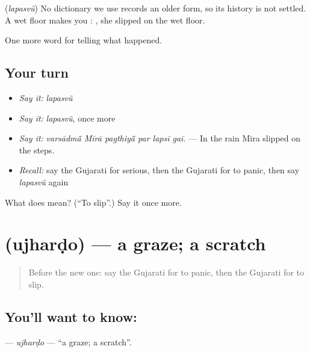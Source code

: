 \begin{cousinweb}
\textbf{} (\emph{lapasvũ}) No dictionary we use records an older form, so its history is not settled. A wet floor makes you \textbf{ }: \textbf{    }, she slipped on the wet floor.
\end{cousinweb}

\begin{grammarlens}[title={What you've built}]
One more word for telling what happened.
\end{grammarlens}

\subsection*{Your turn}
\begin{itemize}
\raggedright
  \item \emph{Say it:} \emph{lapasvũ}
  \item \emph{Say it:} \emph{lapasvũ}, once more
  \item \emph{Say it:} \emph{varsādmā̃ Mīrā pagthiyā̃ par lapsī gaī.} — In the rain Mira slipped on the steps.
  \item \emph{Recall:} say the Gujarati for serious, then the Gujarati for to panic, then say \emph{lapasvũ} again
\end{itemize}

\begin{tcolorbox}[breakable,colback=teal!4,colframe=teal!35!black,title={Before you move on}]
What does  mean? (\textquotedblleft{}To slip\textquotedblright{}.) Say it once more.
\end{tcolorbox}
\section[\texorpdfstring{\gu{ઉઝરડો} (ujharḍo)}{ઉઝરડો (ujharḍo)}]{ (ujharḍo) — a graze; a scratch}

\label{lesson:GU-C294-ujhardo}



\begin{quote}
Before the new one: say the Gujarati for to panic, then the Gujarati for to slip.
\end{quote}

\subsection*{You'll want to know: }
\textbf{} — \emph{ujharḍo} — \textquotedblleft{}a graze; a scratch\textquotedblright{}.

